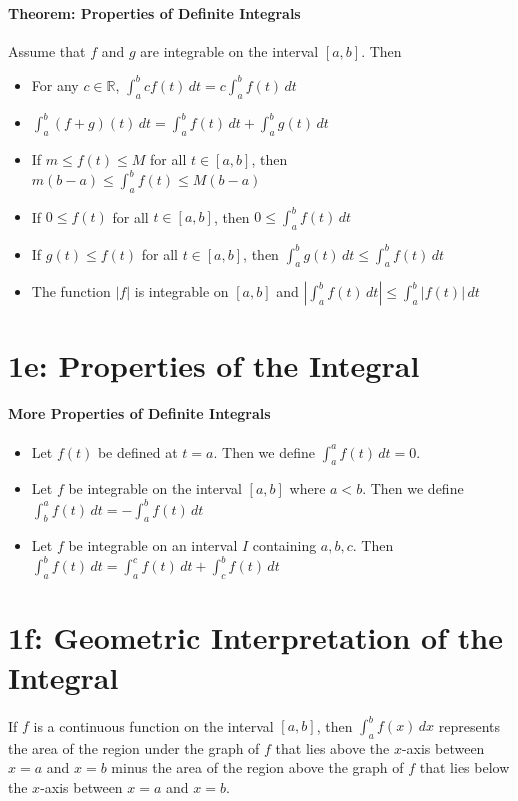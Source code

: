 \documentclass[10pt,letter]{article}
\begin{document}
\paragraph{Theorem: Properties of Definite Integrals}
Assume that $f$ and $g$ are integrable on the interval $[a,b]$. Then 
\begin{itemize}
    \item For any $c\in\mathbb{R}$, $\int_a^bcf(t)\,dt=c\int_a^bf(t)\,dt$ 
    \item $\int_a^b(f+g)(t)\,dt=\int_a^bf(t)\,dt+\int_a^bg(t)\,dt$
    \item If $m\leq f(t)\leq M$ for all $t\in[a,b]$, then $m(b-a)\leq\int_a^bf(t)\leq M(b-a)$
    \item If $0\leq f(t)$ for all $t\in[a,b]$, then $0\leq\int_a^bf(t)\,dt$
    \item If $g(t)\leq f(t)$ for all $t\in[a,b]$, then $\int_a^bg(t)\,dt\leq\int_a^bf(t)\,dt$ 
    \item The function $|f|$ is integrable on $[a,b]$ and $\left|\int_a^bf(t)\,dt\right|\leq\int_a^b|f(t)|\,dt$
\end{itemize}

\section*{1e: Properties of the Integral}
\paragraph{More Properties of Definite Integrals} 
\begin{itemize}
    \item Let $f(t)$ be defined at $t=a$. Then we define $\int_a^af(t)\,dt=0$. 
    \item Let $f$ be integrable on the interval $[a,b]$ where $a<b$. Then we define $\int_b^af(t)\,dt=-\int_a^bf(t)\,dt$
    \item Let $f$ be integrable on an interval $I$ containing $a,b,c$. Then $\int_a^bf(t)\,dt=\int_a^cf(t)\,dt+\int_c^bf(t)\,dt$
\end{itemize}

\section*{1f: Geometric Interpretation of the Integral} 
If $f$ is a continuous function on the interval $[a,b]$, then $\int_a^bf(x)\,dx$ represents the area of the region under the graph of $f$ that lies above the $x$-axis between $x=a$ and $x=b$ minus the area of the region above the graph of $f$ that lies below the $x$-axis between $x=a$ and $x=b$. 
\end{document}
